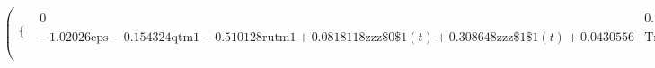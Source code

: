 \begin{gather*}
     \left(
   \begin{array}{cc}
    \{ & 
   \begin{array}{cc}
    0 & 0.767742 \text{eps}+0.116129 \text{qtm1}+0.383871 \text{rutm1}-0.0615634
      \text{zzz$\$$0$\$$1}(t)-0.232258 \text{zzz$\$$1$\$$1}(t)\geq 0.0323994 \\
    -1.02026 \text{eps}-0.154324 \text{qtm1}-0.510128 \text{rutm1}+0.0818118
      \text{zzz$\$$0$\$$1}(t)+0.308648 \text{zzz$\$$1$\$$1}(t)+0.0430556 &
      \text{True} \\
   \end{array}
    \\
   \end{array}
   \right)=\text{zzz$\$$0$\$$1}(t)
\end{gather*}

